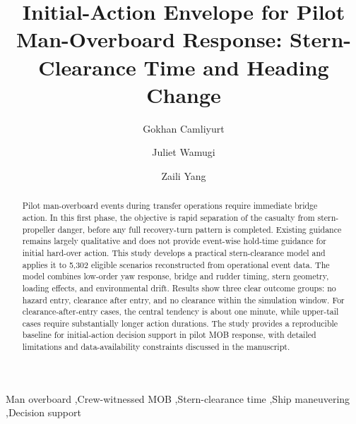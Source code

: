 \documentclass[preprint,12pt]{elsarticle}
\begin{document}
\begin{frontmatter}

\title{Initial-Action Envelope for Pilot Man-Overboard Response: Stern-Clearance Time and Heading Change}

\author[inst1,inst4]{Gokhan Camliyurt}
\author[inst5]{Juliet Wamugi}
\author[inst1]{Zaili Yang}


\address[inst1]{Liverpool Logistics, Offshore and Marine Research Institute, Liverpool John Moores University, Liverpool, United Kingdom}
\address[inst4]{Department of Navigation Sciences, National Korea Maritime and Ocean University, Busan, South Korea}
\address[inst5]{Jomo Kenyatta University of Agriculture and Technology, Nairobi, Kenya}

\begin{abstract}
Pilot man-overboard events during transfer operations require immediate bridge action. In this first phase, the objective is rapid separation of the casualty from stern-propeller danger, before any full recovery-turn pattern is completed. Existing guidance remains largely qualitative and does not provide event-wise hold-time guidance for initial hard-over action. This study develops a practical stern-clearance model and applies it to 5,302 eligible scenarios reconstructed from operational event data. The model combines low-order yaw response, bridge and rudder timing, stern geometry, loading effects, and environmental drift. Results show three clear outcome groups: no hazard entry, clearance after entry, and no clearance within the simulation window. For clearance-after-entry cases, the central tendency is about one minute, while upper-tail cases require substantially longer action durations. The study provides a reproducible baseline for initial-action decision support in pilot MOB response, with detailed limitations and data-availability constraints discussed in the manuscript.
\end{abstract}

\begin{keyword}
Man overboard \sep Crew-witnessed MOB \sep Stern-clearance time \sep Ship maneuvering \sep Decision support
\end{keyword}

\end{frontmatter}
\end{document}
